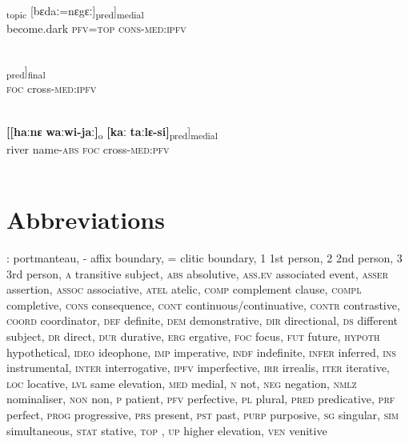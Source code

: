 \documentclass[output=paper]{LSP/langsci}
\begin{document}
\begin{exe}
\ex \label{Aiex:App50}
\gll [\textbf{[[soːlo}	\textbf{di=jaː]}\textsubscript{pred}]\textsubscript{topic}	[bɛdaː=nɛgɛː]\textsubscript{pred}]\textsubscript{medial}\\
become.dark	\textsc{pfv}=\textsc{top}	\textsc{cons}-\textsc{med}:\textsc{ipfv}\\
\glt {}\\
\end{exe}

\begin{exe}
\ex \label{Aiex:App51}
\gll \underline{\smash{[[kaː}}	\underline{\smash{taː=nɛgɛː]}}\textsubscript{pred}]\textsubscript{final}\\
\textsc{foc}	cross-\textsc{med:ipfv}\\
\glt {}\\
\end{exe}

\begin{exe}
\ex \label{Aiex:App52}
\gll \textbf{[[haːnɛ}	\textbf{waːwi-jaː]}\textsubscript{o}	\textbf{[kaː}	\textbf{taːlɛ-si]}\textsubscript{pred}]\textsubscript{medial}\\
river	name-\textsc{abs}	\textsc{foc}	cross-\textsc{med}:\textsc{pfv}\\
\glt {}\\
\end{exe}

\section*{ Abbreviations}

\textsc{:} portmanteau,
\textsc{-} affix boundary,
\textsc{=} clitic boundary,
\textsc{1} 1st person,
\textsc{2} 2nd person,
\textsc{3} 3rd person,
\textsc{a} transitive subject,
\textsc{abs} absolutive,
\textsc{ass.ev} associated event,
\textsc{asser} assertion,
\textsc{assoc} associative,
\textsc{atel} atelic,
\textsc{comp} complement clause,
\textsc{compl} completive,
\textsc{cons} consequence,
\textsc{cont} continuous/continuative,
\textsc{contr} contrastive,
\textsc{coord} coordinator,
\textsc{def} definite,
\textsc{dem} demonstrative,
\textsc{dir} directional,
\textsc{ds} different subject,
\textsc{dr} direct,
\textsc{dur} durative,
\textsc{erg} ergative,
\textsc{foc} focus,
\textsc{fut} future,
\textsc{hypoth} hypothetical,
\textsc{ideo} ideophone,
\textsc{imp} imperative,
\textsc{indf} indefinite,
\textsc{infer} inferred,
\textsc{ins} instrumental,
\textsc{inter} interrogative,
\textsc{ipfv} imperfective,
\textsc{irr} irrealis,
\textsc{iter} iterative,
\textsc{loc} locative,
\textsc{lvl} same elevation,
\textsc{med} medial,
\textsc{n} not,
\textsc{neg} negation,
\textsc{nmlz} nominaliser,
\textsc{non} non,
\textsc{p} patient,
\textsc{pfv} perfective,
\textsc{pl} plural,
\textsc{pred} predicative,
\textsc{prf} perfect,
\textsc{prog} progressive,
\textsc{prs} present,
\textsc{pst} past,
\textsc{purp} purposive,
\textsc{sg} singular,
\textsc{sim} simultaneous,
\textsc{stat} stative,
\textsc{top} ,
\textsc{up} higher elevation,
\textsc{ven} venitive
\end{document}
